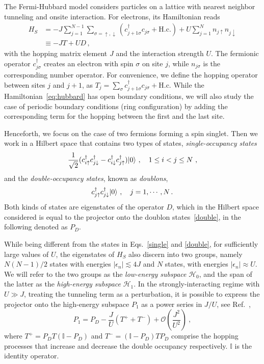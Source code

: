 \documentclass[twocolumn,prb,showpacs]{revtex4-1}
\DeclarePairedDelimiter\ket{\lvert}{\rangle}
\begin{document}
The Fermi-Hubbard model considers particles on a lattice with nearest
neighbor tunneling and onsite interaction.  For electrons, its
Hamiltonian reads
\begin{align}
    H_S & = -J\sum\limits_{j=1}^{N-1}\sum\limits_{\sigma=\uparrow, \downarrow}
    \left( c^\dagger_{j+1\sigma}c_{j\sigma} + \mathrm{H.c.}\right)  
+ U\sum\limits_{j=1}^{N} n_{j\uparrow}n_{j\downarrow} \nonumber \\
& \equiv -J T + UD \,,
\label{eq:hubbard}
\end{align}
with the hopping matrix element $J$ and the interaction strength $U$.  The
fermionic operator $c^\dagger_{j\sigma}$ creates an electron with spin
$\sigma$ on site $j$, while $n_{j\sigma}$ is the corresponding number
operator.  For convenience, we define the hopping operator between 
sites $j$ and $j+1$, as $T_j = \sum_\sigma c^\dagger_{j+1\sigma}c_{j\sigma} +
\mathrm{H.c.}$
While the Hamiltonian~\eqref{eq:hubbard} has open boundary conditions,
we will also study the case of periodic boundary conditions (ring
configuration) by adding the corresponding term for the hopping between
the first and the last site.

Henceforth, we focus on the case of two fermions forming a spin singlet.
Then we work in a Hilbert space that contains two types of states,
\textit{single-occupancy states}
\begin{equation}
\label{single}
 \frac{1}{\sqrt{2}} (c^\dagger_{i\uparrow}c^\dagger_{j\downarrow}-
 c^\dagger_{i\downarrow}c^\dagger_{j\uparrow})\ket{0} \ , 
 \quad 1\leq i < j \leq N \ , 
\end{equation}
and the \textit{double-occupancy states}, known as \textit{doublons},
\begin{equation}
\label{double}
 c^\dagger_{j\uparrow}c^\dagger_{j\downarrow}\ket{0} \ , \quad j=1,\cdots,N \,. 
\end{equation}
Both kinds of states are eigenstates of the operator $D$, which in the
Hilbert space considered is equal to the projector onto the doublon
states~\eqref{double}, in the following denoted as $P_D$.

While being different from the states in Eqs.~\eqref{single} and
\eqref{double}, for sufficiently large values of $U$, the eigenstates of 
$H_S$ also discern into two groups, namely $N(N-1)/2$ states with energies 
$|\epsilon_n|\lesssim 4J$ and $N$ states, with energies $|\epsilon_n|\approx U$.
We will refer to the two groups as the \textit{low-energy subspace} 
$\mathcal{H}_0$, and the span of the latter as the \textit{high-energy 
subspace} $\mathcal{H}_1$. In the strongly-interacting regime with $U\gg J$,
treating the tunneling term as a perturbation, it is possible to express the 
projector onto the high-energy subspace $P_1$ as a power series in $J/U$,
see Ref.~,
\begin{equation}
    P_1 = P_D - \frac{J}{U}(T^+ + T^-) + 
    \mathcal{O}\left( \frac{J^2}{U^2} \right) \ , \label{eq:projector}
\end{equation}
where ${T^+=P_DT(\mathbb{I}-P_D)}$ and ${T^-=(\mathbb{I}-P_D)TP_D}$
comprise the hopping processes that increase and decrease the double
occupancy respectively. $\mathbb{I}$ is the identity operator.
\end{document}
